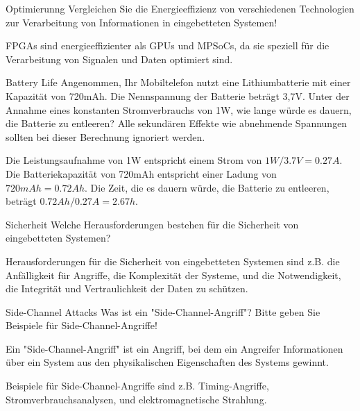 \documentclass{article}
\begin{document}
\begin{exercise}{Optimierunng}
  Vergleichen Sie die Energieeffizienz von verschiedenen Technologien zur Verarbeitung von Informationen in eingebetteten Systemen!

  \begin{solution}
    FPGAs sind energieeffizienter als GPUs und MPSoCs, da sie speziell für die Verarbeitung von Signalen und Daten optimiert sind.
  \end{solution}
\end{exercise}

\begin{exercise}{Battery Life}
  Angenommen, Ihr Mobiltelefon nutzt eine Lithiumbatterie mit einer Kapazität von 720mAh. Die Nennspannung der Batterie beträgt 3,7V. Unter der Annahme eines konstanten Stromverbrauchs von 1W, wie lange würde es dauern, die Batterie zu entleeren? Alle sekundären Effekte wie abnehmende Spannungen sollten bei dieser Berechnung ignoriert werden.

  \begin{solution}
    Die Leistungsaufnahme von 1W entspricht einem Strom von $1W / 3.7V = 0.27A$. Die Batteriekapazität von 720mAh entspricht einer Ladung von $720mAh = 0.72Ah$. Die Zeit, die es dauern würde, die Batterie zu entleeren, beträgt $0.72Ah / 0.27A = 2.67h$.
  \end{solution}
\end{exercise}

\begin{exercise}{Sicherheit}
  Welche Herausforderungen bestehen für die Sicherheit von eingebetteten Systemen?

  \begin{solution}
    Herausforderungen für die Sicherheit von eingebetteten Systemen sind z.B. die Anfälligkeit für Angriffe, die Komplexität der Systeme, und die Notwendigkeit, die Integrität und Vertraulichkeit der Daten zu schützen.
  \end{solution}
\end{exercise}

\begin{exercise}{Side-Channel Attacks}
  Was ist ein "Side-Channel-Angriff"? Bitte geben Sie Beispiele für Side-Channel-Angriffe!

  \begin{solution}
    Ein "Side-Channel-Angriff" ist ein Angriff, bei dem ein Angreifer Informationen über ein System aus den physikalischen Eigenschaften des Systems gewinnt.

    Beispiele für Side-Channel-Angriffe sind z.B. Timing-Angriffe, Stromverbrauchsanalysen, und elektromagnetische Strahlung.
  \end{solution}
\end{exercise}
\end{document}
